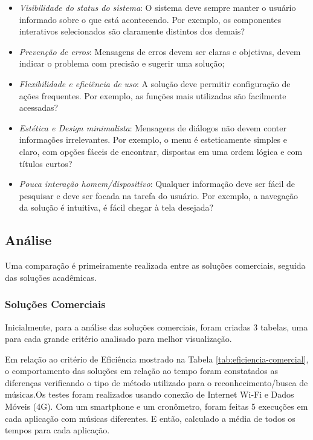 \begin{itemize}
    \begin{itemize}
        \item \textit{Visibilidade do status do sistema}: O sistema deve sempre manter o usuário informado sobre o que está acontecendo. Por exemplo, os componentes interativos selecionados são claramente distintos dos demais?
        \item \textit{Prevenção de erros}: Mensagens de erros devem ser claras e objetivas, devem indicar o problema com precisão e sugerir uma solução;
        \item \textit{Flexibilidade e eficiência de uso}: A solução deve permitir configuração de ações frequentes. Por exemplo, as funções mais utilizadas são facilmente acessadas?
        \item \textit{Estética e Design minimalista}: Mensagens de diálogos não devem conter informações irrelevantes. Por exemplo, o menu é esteticamente simples e claro, com opções fáceis de encontrar, dispostas em uma ordem lógica e com títulos curtos?
        \item \textit{Pouca interação homem/dispositivo}: Qualquer informação deve ser fácil de pesquisar e deve ser focada na tarefa do usuário. Por exemplo, a navegação da solução é intuitiva, é fácil chegar à tela desejada?
    \end{itemize}
\end{itemize}


\subsection{Análise} \label{sec:analise}

Uma comparação é primeiramente realizada entre as soluções comerciais, seguida das soluções acadêmicas.

\subsubsection{Soluções Comerciais}

Inicialmente, para a análise das soluções comerciais, foram criadas 3 tabelas, uma para cada grande critério analisado para melhor visualização.

Em relação ao critério de Eficiência mostrado na Tabela \ref{tab:eficiencia-comercial}, o comportamento das soluções em relação ao tempo foram constatados as diferenças verificando o tipo de método utilizado para o reconhecimento/busca de músicas.Os testes foram realizados usando conexão de Internet Wi-Fi e Dados Móveis (4G). Com um smartphone e um cronômetro, foram feitas 5 execuções em cada aplicação com músicas diferentes. E então, calculado a média de todos os tempos para cada aplicação.


